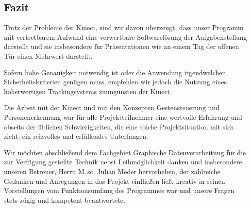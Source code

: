\subsection{Fazit}
Trotz der Probleme der Kinect, sind wir davon überzeugt, dass unser Programm mit vertretbarem Aufwand eine verwertbare Softwarelösung der Aufgabenstellung darstellt und sie insbesondere für Präsentationen wie an einem Tag der offenen Tür einen Mehrwert darstellt.\par 
Sofern hohe Genauigkeit notwendig ist oder die Anwendung irgendwelchen Sicherheitskriterien genügen muss, empfehlen wir jedoch die Nutzung eines höherwertigen Trackingsystems zuungunsten der Kinect.\par 
Die Arbeit mit der Kinect und mit den Konzepten Gestensteuerung und Personenerkennung war für alle Projektteilnehmer eine wertvolle Erfahrung und abseits der üblichen Schwierigkeiten, die eine solche Projektsituation mit sich zieht, ein reizvolles und erfüllendes Unterfangen.\par\bigskip
Wir möchten abschließend dem Fachgebiet Graphische Datenverarbeitung für die zur Verfügung gestellte Technik nebst Leihmöglichkeit danken und insbesondere unseren Betreuer, Herrn M.\,sc. Julian Meder hervorheben, der zahlreiche Gedanken und Anregungen in das Projekt einfließen ließ, kreativ in seinen Vorstellungen vom Funktionsumfang des Programmes war und unsere Fragen stets zügig und kompetent beantwortete.